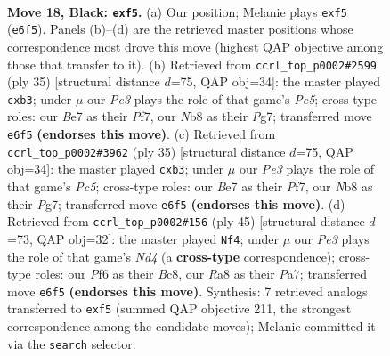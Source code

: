 \documentclass[11pt]{article}
\begin{document}
\clearpage

\begin{figure}[p]\centering
\begin{subfigure}{0.46\textwidth}\centering
\resizebox{\linewidth}{!}{%
\newchessgame
\chessboard[
  setfen={rnb1k2r/pp2b1pp/4pp2/3pPB2/5P1P/6P1/P2NN3/R1B1K2R b KQ - 0 18},
  showmover=false,
  pgfstyle=straightmove, color=movearrow, markmove={e6-f5}
]}
\caption{}
\end{subfigure}\hfill
\begin{subfigure}{0.46\textwidth}\centering
\resizebox{\linewidth}{!}{%
\newchessgame
\chessboard[
  setfen={2r1k2r/p4ppp/bn2p3/N7/2p1P3/bP4P1/P1RB1P1P/4KB1R b Kk - 2 18},
  showmover=false,
  pgfstyle=straightmove, color=movearrow, markmove={c4-b3}
]}
\caption{}
\end{subfigure}
\\[4pt]
\begin{subfigure}{0.46\textwidth}\centering
\resizebox{\linewidth}{!}{%
\newchessgame
\chessboard[
  setfen={2r1k2r/p4ppp/bn2p3/N7/2p1P3/bP4P1/P1RB1P1P/4KB1R b Kk - 2 18},
  showmover=false,
  pgfstyle=straightmove, color=movearrow, markmove={c4-b3}
]}
\caption{}
\end{subfigure}\hfill
\begin{subfigure}{0.46\textwidth}\centering
\resizebox{\linewidth}{!}{%
\newchessgame
\chessboard[
  setfen={r1b3k1/pp1r2bp/5pp1/3np3/P6B/2P2N1P/1PBR1PP1/R5K1 b - - 2 23},
  showmover=false,
  pgfstyle=straightmove, color=movearrow, markmove={d5-f4}
]}
\caption{}
\end{subfigure}
\caption{\textbf{Move 18, Black: \texttt{exf5}.} (a) Our position; Melanie plays \texttt{exf5} (\texttt{e6f5}). Panels (b)--(d) are the retrieved master positions whose correspondence most drove this move (highest QAP objective among those that transfer to it). (b) Retrieved from \texttt{ccrl\_top\_p0002\#2599} (ply 35) [structural distance $d$=75, QAP obj=34]: the master played \texttt{cxb3}; under $\mu$ our \emph{Pe3} plays the role of that game's \emph{Pc5}; cross-type roles: our \emph{B}e7 as their \emph{P}f7, our \emph{N}b8 as their \emph{P}g7; transferred move \texttt{e6f5} \textbf{(endorses this move)}. (c) Retrieved from \texttt{ccrl\_top\_p0002\#3962} (ply 35) [structural distance $d$=75, QAP obj=34]: the master played \texttt{cxb3}; under $\mu$ our \emph{Pe3} plays the role of that game's \emph{Pc5}; cross-type roles: our \emph{B}e7 as their \emph{P}f7, our \emph{N}b8 as their \emph{P}g7; transferred move \texttt{e6f5} \textbf{(endorses this move)}. (d) Retrieved from \texttt{ccrl\_top\_p0002\#156} (ply 45) [structural distance $d$=73, QAP obj=32]: the master played \texttt{Nf4}; under $\mu$ our \emph{Pe3} plays the role of that game's \emph{Nd4} (a \textbf{cross-type} correspondence); cross-type roles: our \emph{P}f6 as their \emph{B}c8, our \emph{R}a8 as their \emph{P}a7; transferred move \texttt{e6f5} \textbf{(endorses this move)}. Synthesis: 7 retrieved analogs transferred to \texttt{exf5} (summed QAP objective 211, the strongest correspondence among the candidate moves); Melanie committed it via the \texttt{search} selector.}
\label{fig:thought-m35}
\end{figure}
\end{document}
